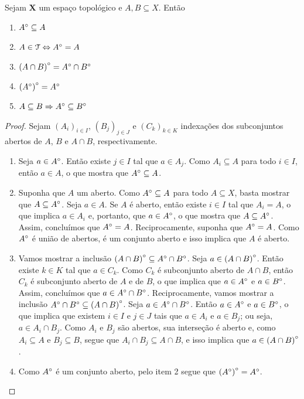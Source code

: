 \begin{proposition}
	Sejam $\bm X$ um espaço topológico e $A,B \subseteq X$. Então
	\begin{enumerate}
	\item ${A}^\circ \subseteq A$
	\item $A \in \mathcal{T} \Leftrightarrow {A}^\circ=A$
	\item ${(A \cap B)}^\circ = {A}^\circ \cap {B}^\circ$
	\item ${({A}^\circ)}^\circ = {A}^\circ$
	\item $A \subseteq B \Rightarrow {A}^\circ \subseteq {B}^\circ$
	\end{enumerate}
\end{proposition}
\begin{proof} Sejam $(A_i)_{i \in I}$, $(B_j)_{j \in J}$ e $(C_k)_{k \in K}$ indexações dos subconjuntos abertos de $A$, $B$ e $A \cap B$, respectivamente.
	\begin{enumerate}
	\item Seja $a \in {A}^\circ$. Então existe $j \in I$ tal que $a \in A_j$. Como $A_i \subseteq A$ para todo $i \in I$, então $a \in A$, o que mostra que ${A}^\circ \subseteq A$.
	
	\item Suponha que $A$ um aberto. Como ${A}^\circ \subseteq A$ para todo $A \subseteq X$, basta mostrar que $A \subseteq {A}^\circ$. Seja $a \in A$.	Se $A$ é aberto, então existe $i \in I$ tal que $A_i = A$, o que implica $a \in A_i$ e, portanto, que $a \in {A}^\circ$, o que mostra que $A \subseteq {A}^\circ$. Assim, concluímos que ${A}^\circ=A$. Reciprocamente, suponha que ${A}^\circ=A$. Como ${A}^\circ$ é união de abertos, é um conjunto aberto e isso implica que $A$ é aberto.
	
	\item Vamos mostrar a inclusão ${(A \cap B)}^\circ \subseteq {A}^\circ \cap {B}^\circ$. Seja $a \in {(A \cap B)}^\circ$. Então existe $k \in K$ tal que $a \in C_k$. Como $C_k$ é subconjunto aberto de $A \cap B$, então $C_k$ é subconjunto aberto de $A$ e de $B$, o que implica que $a \in {A}^\circ$ e $a \in {B}^\circ$. Assim, concluímos que $a \in {A}^\circ \cap {B}^\circ$. Reciprocamente, vamos mostrar a inclusão ${A}^\circ \cap {B}^\circ \subseteq {(A \cap B)}^\circ$. Seja $a \in {A}^\circ \cap {B}^\circ$. Então $a \in {A}^\circ$ e $a \in {B}^\circ$, o que implica que existem $i \in I$ e $j \in J$ tais que $a \in A_i$ e $a \in B_j$; ou seja, $a \in A_i \cap B_j$. Como $A_i$ e $B_j$ são abertos, sua interseção é aberto e, como $A_i \subseteq A$ e $B_j \subseteq B$, segue que $A_i \cap B_j \subseteq A \cap B$, e isso implica que $a \in {(A \cap B)}^\circ$.
	
	\item Como ${A}^\circ$ é um conjunto aberto, pelo item 2 segue que ${({A}^\circ)}^\circ = {A}^\circ$.
\qedhere	
	\end{enumerate}
\end{proof}

